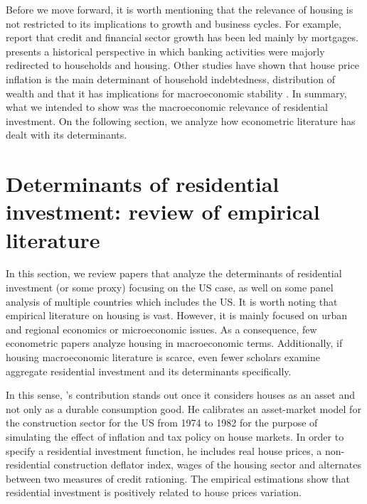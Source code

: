 \documentclass[12pt, a4paper]{article}
\begin{document}
Before we move forward, it is worth mentioning that the relevance of housing is not restricted to its implications to growth and business cycles.
For example, \textcite{jorda_great_2016} report that credit and financial sector growth has been led mainly by mortgages. 
\textcite{kohl_more_2018} presents a historical perspective in which banking activities were majorly redirected to households and housing.
Other studies have shown that house price inflation is the main determinant of household indebtedness, distribution of wealth and that it has implications for macroeconomic stability \cites{ryoo_household_2015}{stockhammer_debt-driven_2016}{barnes_private_2016}{johnston_global_2017}{mian_household_2017}{anderson_politics_2020}{fuller_housing_2020}.
In summary, what we intended to show was the macroeconomic relevance of residential investment.
On the following section, we analyze how econometric literature has dealt with its determinants.
\section{Determinants of residential investment: review of empirical literature}
\label{sec:orge35ce3b}
\label{sec:empirical_review}
In this section, we review papers that analyze the determinants of residential investment (or some proxy) focusing on the US case, as well on some panel analysis of multiple countries which includes the US.
It is worth noting that empirical literature on housing is vast.
However, it is mainly focused on urban and regional economics or microeconomic issues.
As a consequence, few econometric papers analyze housing in macroeconomic terms.
Additionally, if housing macroeconomic literature is scarce, even fewer scholars examine aggregate residential investment and its determinants specifically.

In this sense, \citeauthor*{poterba_tax_1984}'s \citeyear{poterba_tax_1984} contribution stands out once it considers houses as an asset and not only as a durable consumption good.
He calibrates an asset-market model for the construction sector for the US from 1974 to 1982 for the purpose of simulating the effect of inflation and tax policy on house markets.
In order to specify a residential investment function, he includes real house prices, a non-residential construction deflator index, wages of the housing sector and alternates between two measures  of  credit  rationing.
The empirical estimations show that residential investment is positively related to house prices variation.
\end{document}
